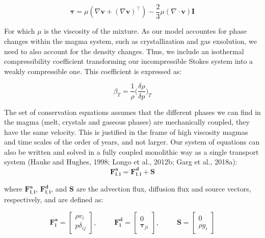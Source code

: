 \begin{equation}
\boldsymbol{\tau} = \mu \left( \nabla \mathbf{v} + (\nabla \mathbf{v})^\top \right) - \frac{2}{3} \mu (\nabla \cdot \mathbf{v}) \mathbf{I}
\end{equation}

For which $\mu$ is the viscosity of the mixture.
As our model accountes for phase changes within the magma system, such as crystallization and gas exsolution, we need to also account for the density changes. Thus, we include an isothermal compressibility coefficient transforming our incompressible Stokes system into a weakly compressible one. This coefficient is expressed as:

\begin{equation}
\beta_T = \frac{1}{\rho}\bigg(\frac{\delta\rho}{\delta p}\bigg)_T
\end{equation}

The set of conservation equations assumes that the different phases we can find in the magma (melt, crystals and gaseous phases) are mechanically coupled, they have the same velocity. This is justified in the frame of high viscosity magmas and time scales of the order of years, and not larger. 
Our system of equations can also be written and solved in a fully coupled monolithic way as a single transport system (Hauke and Hughes, 1998; Longo et al., 2012b; Garg et al., 2018a):
\begin{equation}
\boldsymbol{F^{a}_{i,i}} = \boldsymbol{F^{d}_{i,i}} + \boldsymbol{S}
\end{equation}


where $\boldsymbol{F_{i,i}^{a}}$, $\boldsymbol{F_{i,i}^{d}}$, and $\boldsymbol{S}$ are the advection flux, diffusion flux and source vectors, respectively, and are defined as:

\begin{equation}
\boldsymbol{F^{a}_{i}} = 
\begin{bmatrix}
\rho v_i\\
p\delta_{ij} 
\end{bmatrix}, ~~~~~~~~~~~
\boldsymbol{F^{d}_{i}} = 
\begin{bmatrix}
0\\
\mathbf{\tau}_{ji}
\end{bmatrix}, ~~~~~~~~~~~
\boldsymbol{S} =
\begin{bmatrix}
0\\
\rho g_i
\end{bmatrix}
\end{equation}

